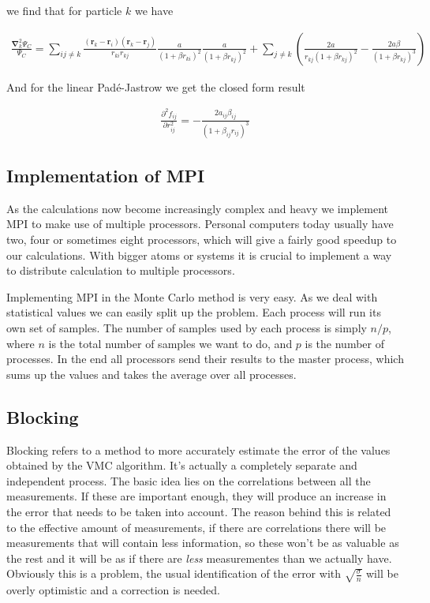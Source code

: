 \documentclass[11pt]{article}
\begin{document}
			we find that for particle $k$ we have

			\begin{align}
				\frac{\mathbf{\nabla}_{k}^{2}\Psi_{C}}{\Psi_{C}}=\sum_{ij\ne k}\frac{(\mathbf{r}_{k}-\mathbf{r}_{i})(\mathbf{r}_{k}-\mathbf{r}_{j})}{r_{ki}r_{kj}}\frac{a}{(1+\beta r_{ki})^{2}}\frac{a}{(1+\beta r_{kj})^{2}}+\sum_{j\ne k}\left(\frac{2a}{r_{kj}(1+\beta r_{kj})^{2}}-\frac{2a\beta}{(1+\beta r_{kj})^{3}}\right)
			\end{align}

			And for the linear Padé-Jastrow we get the closed form result

			\begin{align}
				\frac{\partial^{2}f_{ij}}{\partial r_{ij}^{2}}=-\frac{2a_{ij}\beta_{ij}}{\left(1+\beta_{ij}r_{ij}\right)^{3}}
			\end{align}

	\subsection{Implementation of MPI}
		As the calculations now become increasingly complex and heavy we implement MPI to make use of multiple processors. Personal computers today usually have two, four or sometimes eight processors, which will give a fairly good speedup to our calculations. With bigger atoms or systems it is crucial to implement a way to distribute calculation to multiple processors.

		Implementing MPI in the Monte Carlo method is very easy. As we deal with statistical values we can easily split up the problem. Each process will run its own set of samples. The number of samples used by each process is simply $n/p$, where $n$ is the total number of samples we want to do, and $p$ is the number of processes. In the end all processors send their results to the master process, which sums up the values and takes the average over all processes.

	\subsection{Blocking}
		Blocking refers to a method to more accurately estimate the error of the values obtained by the VMC algorithm. It's actually a completely separate and independent process. The basic idea lies on the correlations between all the measurements. If these are important enough, they will produce an increase in the error that needs to be taken into account. The reason behind this is related to the effective amount of measurements, if there are correlations there will be measurements that will contain less information, so these won't be as valuable as the rest and it will be as if there are \textit{less} measurementes than we actually have. Obviously this is a problem, the usual identification of the error with $\sqrt{\frac{\sigma}{n}}$ will be overly optimistic and a correction is needed.
\end{document}
